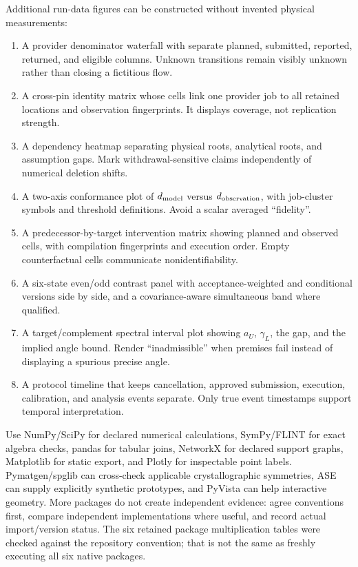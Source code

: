 \documentclass[11pt,a4paper]{article}
\begin{document}
Additional run-data figures can be constructed without invented physical measurements:
\begin{enumerate}
\item A provider denominator waterfall with separate planned, submitted, reported, returned, and eligible columns. Unknown transitions remain visibly unknown rather than closing a fictitious flow.
\item A cross-pin identity matrix whose cells link one provider job to all retained locations and observation fingerprints. It displays coverage, not replication strength.
\item A dependency heatmap separating physical roots, analytical roots, and assumption gaps. Mark withdrawal-sensitive claims independently of numerical deletion shifts.
\item A two-axis conformance plot of $d_{\rm model}$ versus $d_{\rm observation}$, with job-cluster symbols and threshold definitions. Avoid a scalar averaged ``fidelity''.
\item A predecessor-by-target intervention matrix showing planned and observed cells, with compilation fingerprints and execution order. Empty counterfactual cells communicate nonidentifiability.
\item A six-state even/odd contrast panel with acceptance-weighted and conditional versions side by side, and a covariance-aware simultaneous band where qualified.
\item A target/complement spectral interval plot showing $a_U$, $\gamma_L$, the gap, and the implied angle bound. Render ``inadmissible'' when premises fail instead of displaying a spurious precise angle.
\item A protocol timeline that keeps cancellation, approved submission, execution, calibration, and analysis events separate. Only true event timestamps support temporal interpretation.
\end{enumerate}
Use NumPy/SciPy for declared numerical calculations, SymPy/FLINT for exact algebra checks, pandas for tabular joins, NetworkX for declared support graphs, Matplotlib for static export, and Plotly for inspectable point labels. Pymatgen/spglib can cross-check applicable crystallographic symmetries, ASE can supply explicitly synthetic prototypes, and PyVista can help interactive geometry. More packages do not create independent evidence: agree conventions first, compare independent implementations where useful, and record actual import/version status. The six retained package multiplication tables were checked against the repository convention; that is not the same as freshly executing all six native packages.
\end{document}
